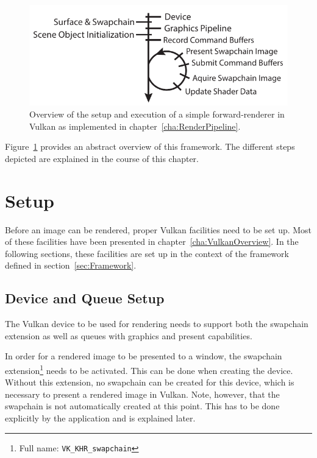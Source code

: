   \begin{figure}
    \includegraphics{Main/Images/RenderSetupAndLoopSimple}
    \centering
    \caption{Overview of the setup and execution of a simple forward-renderer in Vulkan as implemented in chapter~\ref{cha:RenderPipeline}.}
    \label{fig:RenderSetupAndLoopSimple}
  \end{figure}

  Figure~\ref{fig:RenderSetupAndLoopSimple} provides an abstract overview of this framework.
  The different steps depicted are explained in the course of this chapter.


  \section{Setup}
  \label{sec:RenderingSetup}
    Before an image can be rendered, proper Vulkan facilities need to be set up.
    Most of these facilities have been presented in chapter~\ref{cha:VulkanOverview}.
    In the following sections, these facilities are set up in the context of the framework defined in section~\ref{sec:Framework}.

    \subsection{Device and Queue Setup}
      The Vulkan device to be used for rendering needs to support both the swapchain extension as well as queues with graphics and present capabilities.

      In order for a rendered image to be presented to a window, the swapchain extension\footnote{Full name: \lstinline{VK_KHR_swapchain}} needs to be activated.
      This can be done when creating the device.
      Without this extension, no swapchain can be created for this device, which is necessary to present a rendered image in Vulkan.
      Note, however, that the swapchain is not automatically created at this point.
      This has to be done explicitly by the application and is explained later.

